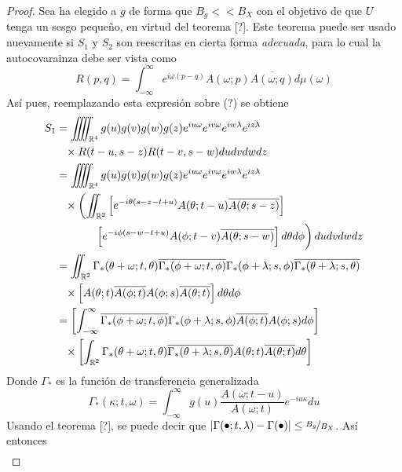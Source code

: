 \documentclass[12pt,letterpaper,draft]{book}
\newcommand{\R}{\mathbb{R}}
\newcommand{\intR}{\int_{-\infty}^{\infty}}
\newcommand{\abso}[1]{\left| #1 \right|}
\newcommand{\pheq}{\phantom{=}}
\begin{document}
\begin{proof}
Sea ha elegido a $g$ de forma que $B_g << B_X$ con el objetivo de que $U$ tenga un sesgo pequeño, en virtud del teorema [?]. Este teorema puede ser usado nuevamente si $S_1$ y $S_2$ son reescritas en cierta forma \textit{adecuada}, para lo cual la autocovarainza debe ser vista como
\begin{equation}
R(p,q) = \intR e^{i \omega (p-q)} A(\omega; p)\overline{A(\omega; q)} d\mu(\omega) 
\end{equation}
Así pues, reemplazando esta expresión sobre (?) se obtiene
\begin{align*}
S_1 &=
\iiiint_{\R^{4}} g(u) g(v) g(w) g(z) e^{i u \omega} e^{i v \omega} e^{i w \lambda} e^{i z \lambda} \\
&\pheq \times R(t-u,s-z)R(t-v,s-w) du dv dw dz \\
&= 
\iiiint_{\R^{4}} g(u) g(v) g(w) g(z) e^{i u \omega} e^{i v \omega} e^{i w \lambda} e^{i z \lambda} \\
&\pheq \times \left( 
\iint_{\R^{2}} 
\left[ 
e^{-i \theta (s-z-t+u)} A(\theta; t-u) \overline{A(\theta; s-z)} 
\right] 
\right. \\
&\pheq 
\left. \vphantom{\int} \phantom{times}
\left[ e^{-i \phi (s-w-t+u)} A(\phi; t-v) \overline{A(\theta; s-w)} \right] d\theta d\phi
\right) du dv dw dz
\\
 &= \iint_{\R^{2}} \Gamma_*(\theta+ \omega; t, \theta) \overline{\Gamma_*(\phi + \omega; t, \phi)}
 \Gamma_*(\phi+ \lambda; s, \phi) \overline{\Gamma_*(\theta + \lambda; s, \theta)} \\
 &\pheq \times
 \left[
 A(\theta; t) \overline{A(\phi; t)} A(\phi; s) \overline{A(\theta; t)}
 \right] d\theta d\phi
\\
 &= \left[ \intR \overline{\Gamma_*(\phi + \omega; t, \phi)} \Gamma_*(\phi+ \lambda; s, \phi)
 \overline{A(\phi; t)} A(\phi; s) d\phi \right] \\
 &\pheq \times \left[ \int_{\R^{2}} \Gamma_*(\theta+ \omega; t, \theta) 
  \overline{\Gamma_*(\theta + \lambda; s, \theta)}  
 A(\theta; t)   \overline{A(\theta; t)} d\theta \right] 
\end{align*}
Donde $\Gamma_*$ es la función de transferencia generalizada
\begin{equation}
\Gamma_*(\kappa; t, \omega) = \intR g(u) \frac{A(\omega; t-u)}{A(\omega; t)} e^{-i u \kappa} du
\end{equation}
Usando el teorema [?], se puede decir que $\abso{\Gamma(\bullet; t, \lambda) - \Gamma(\bullet)} \leq \nicefrac{B_g}{B_X}$. Así entonces
\begin{align*}

\end{align*}
\end{proof}
\end{document}
